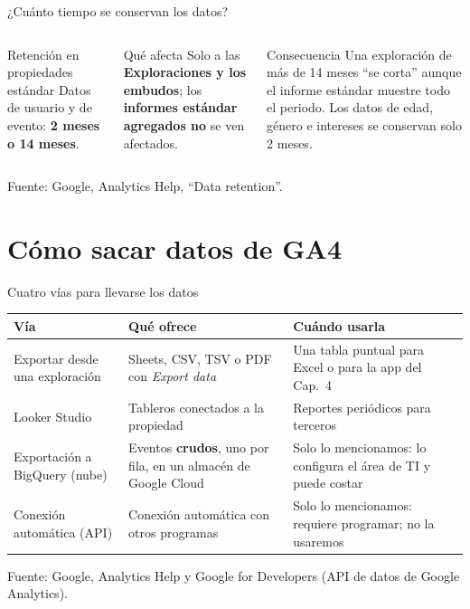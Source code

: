 \documentclass[aspectratio=169,xcolor=dvipsnames]{beamer}
\newcommand{\fuente}[1]{{\tiny\color{IPNgris}Fuente: #1}}
\begin{document}
\begin{frame}{¿Cuánto tiempo se conservan los datos?}
\begin{columns}[T]
  \begin{block}{Retención en propiedades estándar}
    \small Datos de usuario y de evento: \textbf{2 meses o 14 meses}.
  \end{block}
  \begin{alertblock}{Qué afecta}
    \small Solo a las \textbf{Exploraciones y los embudos}; los \textbf{informes estándar agregados no} se ven afectados.
  \end{alertblock}
  \begin{exampleblock}{Consecuencia}
    \small Una exploración de más de 14 meses \enquote{se corta} aunque el informe estándar muestre todo el periodo. Los datos de edad, género e intereses se conservan solo 2 meses.
  \end{exampleblock}
\end{columns}
\fuente{Google, Analytics Help, \enquote{Data retention}.}
\end{frame}

\section[Sacar datos]{Cómo sacar datos de GA4}

\begin{frame}{Cuatro vías para llevarse los datos}
\footnotesize
\begin{center}
\begin{tabular}{@{}>{\raggedright}p{2.5cm}>{\raggedright}p{5.6cm}>{\raggedright\arraybackslash}p{3.7cm}@{}}
\toprule
\textbf{Vía} & \textbf{Qué ofrece} & \textbf{Cuándo usarla} \\
\midrule
Exportar desde una exploración & Sheets, CSV, TSV o PDF con \textit{Export data} & Una tabla puntual para Excel o para la app del Cap.~4 \\
Looker Studio & Tableros conectados a la propiedad & Reportes periódicos para terceros \\
Exportación a BigQuery (nube) & Eventos \textbf{crudos}, uno por fila, en un almacén de Google Cloud & Solo lo mencionamos: lo configura el área de TI y puede costar \\
Conexión automática (API) & Conexión automática con otros programas & Solo lo mencionamos: requiere programar; no la usaremos \\
\bottomrule
\end{tabular}
\end{center}
\fuente{Google, Analytics Help y Google for Developers (API de datos de Google Analytics).}
\end{frame}
\end{document}
